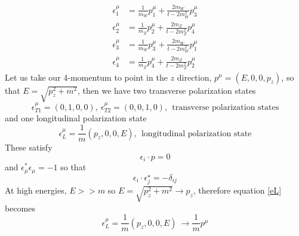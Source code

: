 \documentclass[11pt]{article}
\begin{document}
{\begin{equation}
\begin{aligned}
    \epsilon_{1}^{\mu}&=\frac{1}{m_{W}} p_{1}^{\mu}+\frac{2 m_{W}}{t-2 m_{W}^{2}} p_{3}^{\mu} \\
    \epsilon_{2}^{\mu}&=\frac{1}{m_{Z}} p_{2}^{\mu}+\frac{2 m_{Z}}{t-2 m_{Z}^{2}} p_{4}^{\mu} \\
    \epsilon_{3}^{\mu}&=\frac{1}{m_{W}} p_{3}^{\mu}+\frac{2 m_{W}}{t-2 m_{W}^{2}} p_{1}^{\mu} \\
    \epsilon_{4}^{\mu}&=\frac{1}{m_{Z}} p_{4}^{\mu}+\frac{2 m_{Z}}{t-2 m_{Z}^{2}} p_{2}^{\mu}
\end{aligned}
\end{equation}
Let us take our 4-momentum to point in the $z$ direction, $ p^{\mu}=\left(E, 0,0, p_{z}\right)$, so that $E=\sqrt{p_{z}^{2}+m^{2}}$,  then we have two transverse polarization states 
\begin{equation}
\epsilon_{T 1}^{\mu}=(0,1,0,0), \ \epsilon_{T 2}^{\mu}=(0,0,1,0), \ \ \text{transverse polarization states}
\end{equation} 
and one longitudinal polarization state
\begin{equation}
\epsilon_{L}^{\mu}=\frac{1}{m}\left(p_{z}, 0,0, E\right), \ \ \text{longitudinal polarization state}
\label{eL}
\end{equation}
These satisfy 
\begin{equation}
    \epsilon_{i} \cdot p=0
\end{equation}
and $\epsilon_{\mu}^{*} \epsilon_{\mu}=-1$ so that
\begin{equation}
    \epsilon_{i} \cdot \epsilon_{j}^{\star}=-\delta_{i j}
\end{equation}
At high energies, $E >> m$ so $E=\sqrt{p_{z}^{2}+m^{2}} \rightarrow p_{z}$, therefore equation \ref{eL} becomes
\begin{equation}
\epsilon_{L}^{\mu}=\frac{1}{m}\left(p_{z}, 0,0, E\right) \  \rightarrow \frac{1}{m} p^{\mu}
\end{equation}
}
\end{document}
